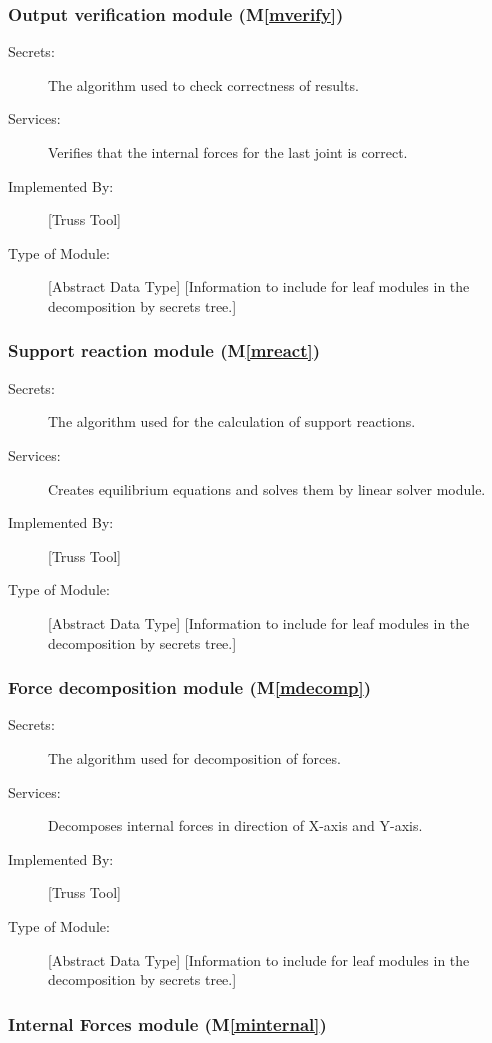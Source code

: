 \documentclass[12pt, titlepage]{article}
\newcommand{\mref}[1]{M\ref{#1}}
\begin{document}
\subsubsection{Output verification module (\mref{mverify})}

\begin{description}
\item[Secrets:]The algorithm used to check correctness of results.
\item[Services:] Verifies that the internal forces for the last joint is correct.
\item[Implemented By:] [Truss Tool]
\item[Type of Module:] [Abstract Data Type]
  [Information to include for leaf modules in the decomposition by secrets tree.]
\end{description}
\subsubsection{Support reaction module (\mref{mreact})}

\begin{description}
\item[Secrets:]The algorithm used for the calculation of support reactions.
\item[Services:] Creates equilibrium equations  and solves them by linear solver module.
\item[Implemented By:] [Truss Tool]
\item[Type of Module:] [Abstract Data Type]
  [Information to include for leaf modules in the decomposition by secrets tree.]
\end{description}
\subsubsection{Force decomposition module (\mref{mdecomp})}

\begin{description}
\item[Secrets:]The algorithm used for decomposition of forces.
\item[Services:] Decomposes internal forces in direction of X-axis and Y-axis.
\item[Implemented By:] [Truss Tool]
\item[Type of Module:] [Abstract Data Type]
  [Information to include for leaf modules in the decomposition by secrets tree.]
\end{description}
\subsubsection{Internal Forces module (\mref{minternal})}
\end{document}
